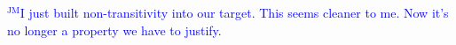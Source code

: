 \documentclass{article}
\theoremstyle{definition}
\theoremstyle{definition}
\theoremstyle{definition}
\theoremstyle{definition}
\theoremstyle{remark}
\theoremstyle{definition}
\theoremstyle{definition}
\newcommand{\jm}[1]{\textcolor{blue}{$^{\textrm{JM}}${#1}}}
\begin{document}
 \jm{I just built non-transitivity into our target. This seems cleaner to me. Now it's no longer a property we have to justify.}

%
%
%
%
%
%
\end{document}
